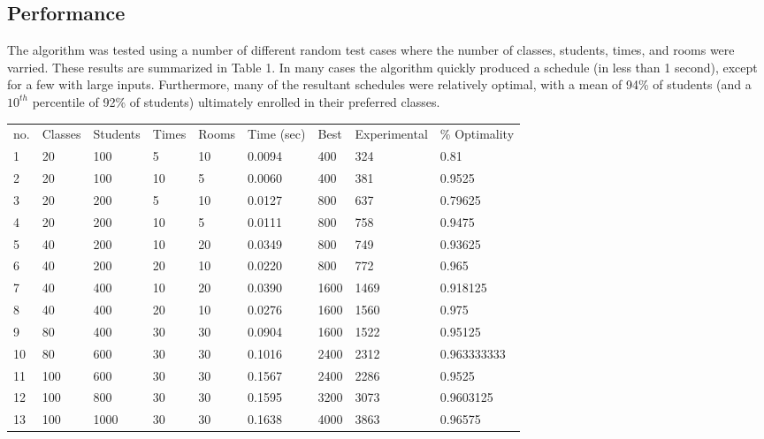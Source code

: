 \documentclass[11pt, oneside]{article}   	%
\begin{document}
\subsection{Performance}
The algorithm was tested using a number of different random test cases where the number of classes, students, times, and rooms were varried. These results are summarized in Table 1. In many cases the algorithm quickly produced a schedule (in less than 1 second), except for a few with large inputs. Furthermore, many of the resultant schedules were relatively optimal, with a mean of 94\% of students (and a $10^{th}$ percentile of 92\% of students) ultimately enrolled in their preferred classes.
\begin{table}[h]
\centering
\begin{tabular}{lllllllll}
no. & Classes & Students & Times & Rooms & Time (sec) & Best   & Experimental & \% Optimality \\
1   & 20      & 100      & 5     & 10    & 0.0094     & 400    & 324          & 0.81         \\
2   & 20      & 100      & 10    & 5     & 0.0060     & 400    & 381          & 0.9525       \\
3   & 20      & 200      & 5     & 10    & 0.0127     & 800    & 637          & 0.79625      \\
4   & 20      & 200      & 10    & 5     & 0.0111     & 800    & 758          & 0.9475       \\
5   & 40      & 200      & 10    & 20    & 0.0349     & 800    & 749          & 0.93625      \\
6   & 40      & 200      & 20    & 10    & 0.0220     & 800    & 772          & 0.965        \\
7   & 40      & 400      & 10    & 20    & 0.0390     & 1600   & 1469         & 0.918125     \\
8   & 40      & 400      & 20    & 10    & 0.0276     & 1600   & 1560         & 0.975        \\
9   & 80      & 400      & 30    & 30    & 0.0904     & 1600   & 1522         & 0.95125      \\
10  & 80      & 600      & 30    & 30    & 0.1016     & 2400   & 2312         & 0.963333333  \\
11  & 100     & 600      & 30    & 30    & 0.1567     & 2400   & 2286         & 0.9525       \\
12  & 100     & 800      & 30    & 30    & 0.1595     & 3200   & 3073         & 0.9603125    \\
13  & 100     & 1000     & 30    & 30    & 0.1638     & 4000   & 3863         & 0.96575      \\

\end{tabular}
\end{table}
\end{document}
